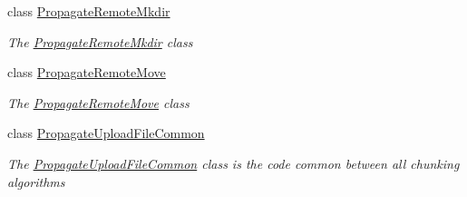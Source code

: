 \begin{DoxyCompactItemize}
class \hyperlink{class_o_c_c_1_1_propagate_remote_mkdir}{Propagate\+Remote\+Mkdir}
\begin{DoxyCompactList}\small\item\em The \hyperlink{class_o_c_c_1_1_propagate_remote_mkdir}{Propagate\+Remote\+Mkdir} class \end{DoxyCompactList}\item 
class \hyperlink{class_o_c_c_1_1_propagate_remote_move}{Propagate\+Remote\+Move}
\begin{DoxyCompactList}\small\item\em The \hyperlink{class_o_c_c_1_1_propagate_remote_move}{Propagate\+Remote\+Move} class \end{DoxyCompactList}\item 
class \hyperlink{class_o_c_c_1_1_propagate_upload_file_common}{Propagate\+Upload\+File\+Common}
\begin{DoxyCompactList}\small\item\em The \hyperlink{class_o_c_c_1_1_propagate_upload_file_common}{Propagate\+Upload\+File\+Common} class is the code common between all chunking algorithms


\end{DoxyCompactList}
\end{DoxyCompactItemize}
